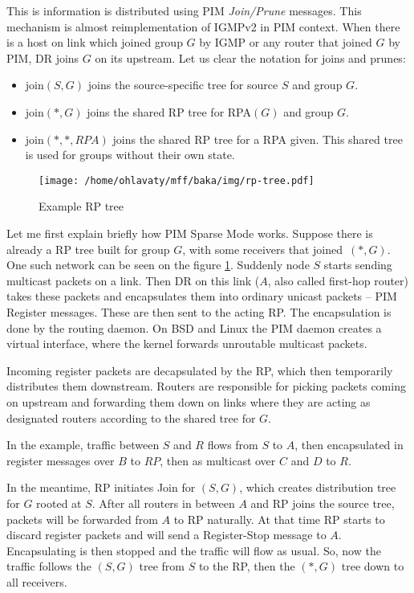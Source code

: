 This is information is distributed using PIM \emph{Join/Prune} messages. This
mechanism is almost reimplementation of IGMPv2 in PIM context. When there is
a host on link which joined group $G$ by IGMP or any router that joined $G$ by
PIM, DR joins $G$ on its upstream. Let us clear the notation for joins and prunes:

\begin{itemize}
  \item join$(S, G)$ joins the source-specific tree for source $S$ and group $G$.
  \item join$(*, G)$ joins the shared RP tree for RPA$(G)$ and group $G$.
  \item join$(*, *, RPA)$ joins the shared RP tree for a RPA given. This shared
    tree is used for groups without their own state.
\end{itemize}

\begin{figure}[htp]
\centering
\texttt{[image: /home/ohlavaty/mff/baka/img/rp-tree.pdf]}
\caption{Example RP tree}
\label{rp-tree}
\end{figure}

Let me first explain briefly how PIM Sparse Mode works. Suppose there is
already a RP tree built for group $G$, with some receivers that joined~$(*,G)$.
One such network can be seen on the figure \ref{rp-tree}.
Suddenly node $S$ starts sending multicast packets on a link. Then DR on
this link ($A$, also called first-hop router) takes these packets and
encapsulates them into ordinary unicast packets -- PIM Register messages. These
are then sent to the acting RP. The encapsulation is done by the routing
daemon. On BSD and Linux the PIM daemon creates a virtual interface, where the
kernel forwards unroutable multicast packets.

Incoming register packets are decapsulated by the RP, which then temporarily
distributes them downstream. Routers are responsible for picking packets coming
on upstream and forwarding them down on links where they are acting as
designated routers according to the shared tree for $G$.

In the example, traffic between $S$ and $R$ flows from $S$ to $A$, then
encapsulated in register messages over $B$ to $RP$, then as multicast over $C$
and $D$ to $R$.

In the meantime, RP initiates Join for $(S, G)$, which creates distribution
tree for $G$ rooted at $S$. After all routers in between $A$ and RP joins the
source tree, packets will be forwarded from $A$ to RP naturally. At that time
RP starts to discard register packets and will send a Register-Stop message to
$A$. Encapsulating is then stopped and the traffic will flow as usual. So, now
the traffic follows the $(S,G)$ tree from $S$ to the RP, then the $(*,G)$ tree
down to all receivers.

